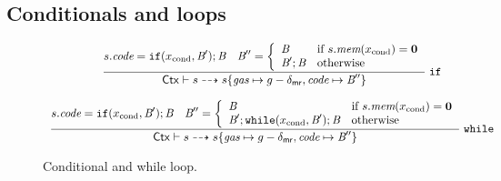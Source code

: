 \subsection{Conditionals and loops}

\begin{figure}[ht]
$$
\begin{array}{c}
\dfrac{
s.\textit{code} =  \mathtt{if}(x_\textrm{cond},\textit{B}');\textit{B}
\quad \textit{B}'' = \left\{\begin{array}{ll}
\textit{B}  &\hbox{if}\ s.\textit{mem}(x_\textrm{cond}) = \mathbf{0} \\
\textit{B}';\textit{B}&\hbox{otherwise} \\
\end{array}\right.
} 
{
\mathsf{Ctx} \vdash s \dashrightarrow s\{
\textit{gas}\mapsto g-\delta_{\mathsf{mr}},
\textit{code}\mapsto \textit{B}''\}
}\;\mathtt{if}
\\\\
\dfrac{
s.\textit{code} =  \mathtt{if}(x_\textrm{cond},\textit{B}');\textit{B}
\quad \textit{B}'' = \left\{\begin{array}{ll}
\textit{B} &\hbox{if}\ s.\textit{mem}(x_\textrm{cond}) = \mathbf{0}\\
\textit{B}';\mathtt{while}(x_\textrm{cond},\textit{B}');\textit{B} &\hbox{otherwise}
\end{array}\right.
} 
{
\mathsf{Ctx} \vdash s \dashrightarrow s\{\textit{gas}\mapsto g-\delta_{\mathsf{mr}},\textit{code}\mapsto \textit{B}''\}
}\;\mathtt{while} 
\end{array}
$$
\caption{Conditional and while loop.}
\end{figure}